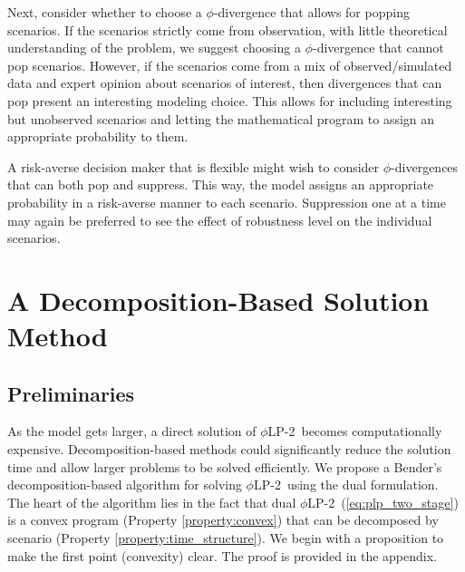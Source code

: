 \documentclass[opre,nonblindrev]{informs3} %
\newcommand{\plp}{$\phi$LP-2}
\begin{document}
Next, consider whether to choose a  $\phi$-divergence that allows for popping scenarios.
If the scenarios strictly come from observation, with little theoretical understanding of the problem, we suggest choosing a $\phi$-divergence that cannot pop scenarios.
However, if the scenarios come from a mix of observed/simulated data and expert opinion about scenarios of interest, then divergences that can pop present an interesting modeling choice.
This allows for including interesting but unobserved scenarios and letting the mathematical program to assign an appropriate probability to them.


A risk-averse decision maker that is flexible might wish to consider $\phi$-divergences that can both pop and suppress. 
This way, the model assigns an appropriate probability in a risk-averse manner to each scenario. 
Suppression one at a time may again be preferred to see the effect of robustness level on the individual scenarios. 



\section{A Decomposition-Based Solution Method}
\label{sec:soln_algorithm}

\subsection{Preliminaries}
\label{ssec:prelim}

As the model gets larger, a direct solution of \plp\ becomes computationally expensive. 
Decomposition-based methods could significantly reduce the solution time and allow larger problems to be solved efficiently. 
We propose a Bender's decomposition-based algorithm for solving \plp\ using the dual formulation. 
The heart of the algorithm lies in the fact that dual \plp\ (\ref{eq:plp_two_stage}) is a convex program (Property \ref{property:convex}) that can be decomposed by scenario (Property \ref{property:time_structure}).
We begin with a proposition to make the first point (convexity) clear. 
The proof is provided in the appendix. 
\end{document}

